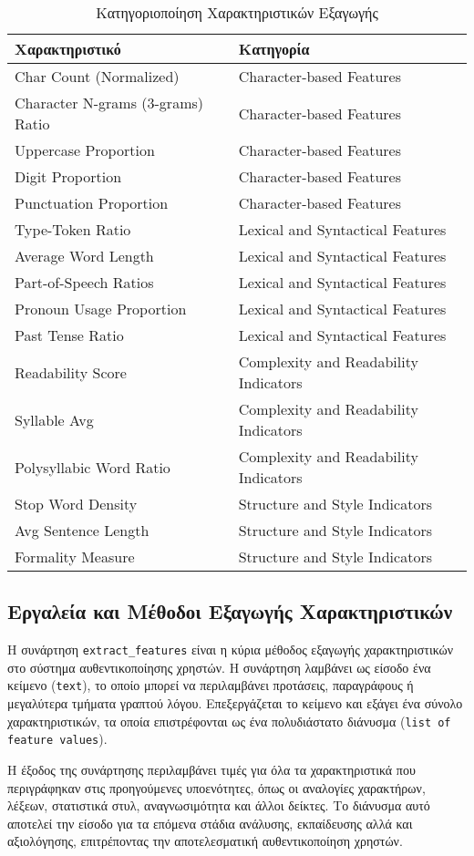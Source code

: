 \begin{table}[H]
\centering
\begin{tabular}{|l|l|}
\hline
\textbf{Χαρακτηριστικό} & \textbf{Κατηγορία} \\
\hline
Char Count (Normalized) & Character-based Features \\
Character N-grams (3-grams) Ratio & Character-based Features \\
Uppercase Proportion & Character-based Features \\
Digit Proportion & Character-based Features \\
Punctuation Proportion & Character-based Features \\
Type-Token Ratio & Lexical and Syntactical Features \\
Average Word Length & Lexical and Syntactical Features \\
Part-of-Speech Ratios & Lexical and Syntactical Features \\
Pronoun Usage Proportion & Lexical and Syntactical Features \\
Past Tense Ratio & Lexical and Syntactical Features \\
Readability Score & Complexity and Readability Indicators \\
Syllable Avg & Complexity and Readability Indicators \\
Polysyllabic Word Ratio & Complexity and Readability Indicators \\
Stop Word Density & Structure and Style Indicators \\
Avg Sentence Length & Structure and Style Indicators \\
Formality Measure & Structure and Style Indicators \\
\hline
\end{tabular}
\caption{Κατηγοριοποίηση Χαρακτηριστικών Εξαγωγής}
\label{tab:features}
\end{table}

\subsection{Εργαλεία και Μέθοδοι Εξαγωγής Χαρακτηριστικών}

Η συνάρτηση \texttt{extract\_features} είναι η κύρια μέθοδος εξαγωγής χαρακτηριστικών στο σύστημα αυθεντικοποίησης χρηστών. Η συνάρτηση λαμβάνει ως είσοδο ένα κείμενο (\texttt{text}), το οποίο μπορεί να περιλαμβάνει προτάσεις, παραγράφους ή μεγαλύτερα τμήματα γραπτού λόγου. Επεξεργάζεται το κείμενο και εξάγει ένα σύνολο χαρακτηριστικών, τα οποία επιστρέφονται ως ένα πολυδιάστατο διάνυσμα (\texttt{list of feature values}).

Η έξοδος της συνάρτησης περιλαμβάνει τιμές για όλα τα χαρακτηριστικά που περιγράφηκαν στις προηγούμενες υποενότητες, όπως οι αναλογίες χαρακτήρων, λέξεων, στατιστικά στυλ, αναγνωσιμότητα και άλλοι δείκτες. Το διάνυσμα αυτό αποτελεί την είσοδο για τα επόμενα στάδια ανάλυσης, εκπαίδευσης αλλά και αξιολόγησης, επιτρέποντας την αποτελεσματική αυθεντικοποίηση χρηστών.
